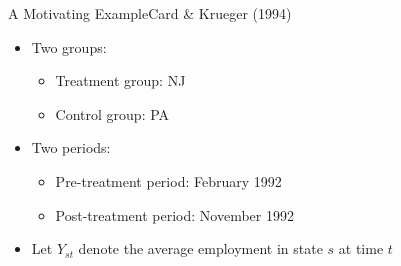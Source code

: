 \documentclass[dvipsnames,hyperref={pdfpagelabels=false}]{beamer}
\begin{document}
\begin{frame}{A Motivating Example}{Card \& Krueger (1994)}
\begin{itemize}
\item Two groups:
\vspace{0.2cm} 
\begin{itemize}
\item Treatment group: NJ
\vspace{0.2cm} 
\item Control group: PA
\end{itemize}
\vspace{0.2cm} 
\item Two periods:
\vspace{0.2cm} 
\begin{itemize}
\item Pre-treatment period: February 1992
\vspace{0.2cm} 
\item Post-treatment period: November 1992
\end{itemize}
\vspace{0.2cm} 
\item Let $Y_{st}$ denote the average employment in state $s$ at time $t$  	

\end{itemize}	
\end{frame}
\end{document}
